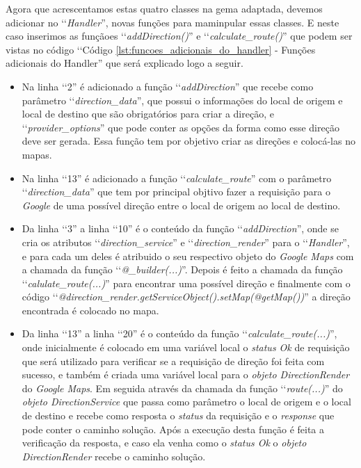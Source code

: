 Agora que acrescentamos estas quatro classes na gema adaptada, devemos adicionar no ‘‘\emph{Handler}'', 
novas funções para maminpular essas classes. E neste caso inserimos as funçãoes ‘‘\emph{addDirection()}'' e 
‘‘\emph{calculate\_route()}'' que podem ser vistas no código ‘‘Código 
\ref{lst:funcoes_adicionais_do_handler} - Funções adicionais do Handler'' que será explicado logo a seguir.

\begin{itemize}

 \item Na linha ‘‘2'' é adicionado a função ‘‘\emph{addDirection}'' que recebe como parâmetro 
 ‘‘\emph{direction\_data}'', que possui o informações do local de origem e local de destino que são 
 obrigatórios para criar a direção, e ‘‘\emph{provider\_options}'' que pode conter as opções da forma
 como esse direção deve ser gerada. Essa função tem por objetivo criar as direções e colocá-las no mapas.
 
 \item Na linha ‘‘13'' é adicionado a função ‘‘\emph{calculate\_route}'' com o parâmetro 
 ‘‘\emph{direction\_data}'' que tem por principal objtivo fazer a requisição para o \emph{Google } de uma 
 possível direção entre o local de origem ao local de destino.
 
 \item Da linha ‘‘3'' a linha ‘‘10'' é o conteúdo da função ‘‘\emph{addDirection}'', onde se cria os
 atributos ‘‘\emph{direction\_service}'' e ‘‘\emph{direction\_render}'' para o ‘‘\emph{Handler}'', e
 para cada um deles é atribuido o seu respectivo objeto do \emph{Google Maps} com a chamada da função 
 ‘‘\emph{@\_builder(...)}''. Depois é feito a chamada da função ‘‘\emph{calulate\_route(...)}''
 para encontrar uma possível direção e finalmente com o código 
 ‘‘\emph{@direction\_render.getServiceObject().setMap(@getMap())}'' a direção encontrada é colocado 
 no mapa.
 
 \item Da linha ‘‘13'' a linha ‘‘20'' é o conteúdo da função ‘‘\emph{calculate\_route(...)}'', onde 
 inicialmente é colocado em uma variável local o \emph{status Ok} de requisição que será utilizado
 para verificar se a requisição de direção foi feita com sucesso, e também é criada uma variável local 
 para o \emph{objeto DirectionRender} do \emph{Google Maps}. Em seguida através da chamada da função 
 ‘‘\emph{route(...)}'' do \emph{objeto DirectionService} que passa como parâmetro o local de origem e
 o local de destino e recebe como resposta o \emph{status} da requisição e o \emph{response} que pode
 conter o caminho solução. Após a execução desta função é feita a verificação da resposta, e caso 
 ela venha como o \emph{status Ok} o \emph{objeto DirectionRender} recebe o caminho solução.
 
\end{itemize}

